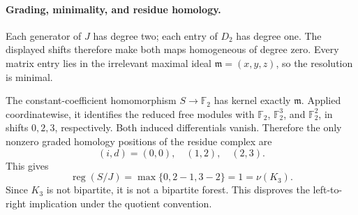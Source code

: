 \documentclass[11pt]{article}
\newcommand{\F}{\mathbb F_2}
\newcommand{\reg}{\operatorname{reg}}
\begin{document}
\paragraph{Grading, minimality, and residue homology.}
Each generator of $J$ has degree two; each entry of $D_2$ has degree one. The displayed shifts therefore make both maps homogeneous of degree zero. Every matrix entry lies in the irrelevant maximal ideal $\mathfrak m=(x,y,z)$, so the resolution is minimal.

The constant-coefficient homomorphism $S\to\F$ has kernel exactly $\mathfrak m$. Applied coordinatewise, it identifies the reduced free modules with $\F$, $\F^3$, and $\F^2$, in shifts $0,2,3$, respectively. Both induced differentials vanish. Therefore the only nonzero graded homology positions of the residue complex are
\[
 (i,d)=(0,0),\quad(1,2),\quad(2,3).
\]
This gives
\[
 \reg(S/J)=\max\{0,2-1,3-2\}=1=\nu(K_3).
\]
Since $K_3$ is not bipartite, it is not a bipartite forest. This disproves the left-to-right implication under the quotient convention.
\end{document}
